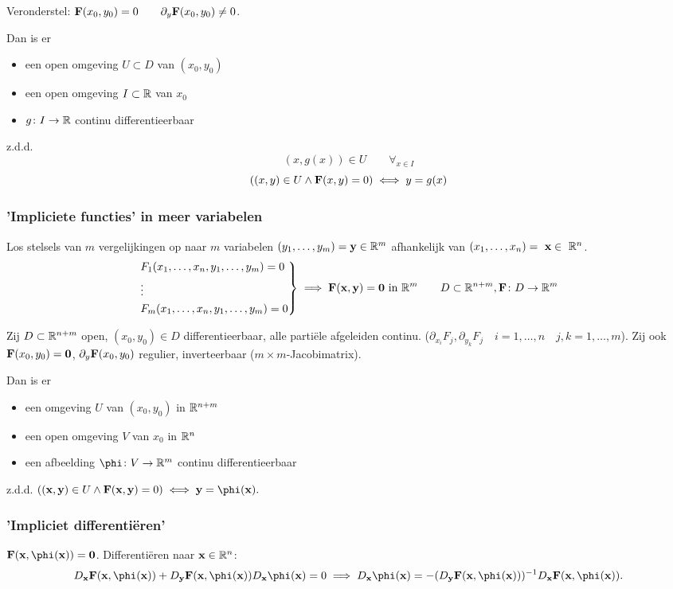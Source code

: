 \documentclass{2wa40summary}
\begin{document}
			Veronderstel: $ {\textbf{F}}(x_0, y_0) = 0 \qquad \partial_y {\textbf{F}}(x_0, y_0)\neq 0 $.
			
			Dan is er 
			\begin{itemize} 
				\item[] een open omgeving $ U \subset D $ van $ (x_0,y_0) $
				\item[] een open omgeving $ I \subset \mathbb{R} $ van $ x_0 $
				\item[] $ g\colon  I \to \mathbb{R} $ continu differentieerbaar 
			\end{itemize}
			z.d.d.
			\[ (x,g(x)) \in U \qquad \forall_{x \in I} \]
			\[ ((x,y) \in U \wedge {\textbf{F}}(x,y)=0) \iff y=g(x) \]
			
			
			\subsubsection{'Impliciete functies' in meer variabelen}
				Los stelsels van $m$ vergelijkingen op naar $m$ variabelen $(y_1, \dots ,y_m) = {\textbf{y}} \in \mathbb{R}^m$ afhankelijk van $ (x_1, \dots , x_n) =~{\textbf{x}} \in~\mathbb{R}^n $.
				\[
				\begin{rcases*}
				F_1(x_1,\dots,x_n,y_1,\dots,y_m)=0 \\
				\vdots \\
				F_m(x_1,\dots,x_n,y_1,\dots,y_m)=0
				\end{rcases*} \implies \F (\x,\y)=\zero \text{ in } \reals^m \qquad D \subset \reals^{n+m}, \F\:  D \to \reals^m
				\]
				
				 Zij $ D\subset \mathbb{R}^{n+m} $ open, $ (x_0, y_0) \in D $ differentieerbaar, alle parti\"ele afgeleiden continu. ($ \partial_{x_i}F_j , \partial_{y_k}F_j \quad i=1,\dots,n \quad j,k=1,\dots,m $). Zij ook $ {\textbf{F}}(x_0, y_0) = {\textbf{0}}$, $ \partial_y {\textbf{F}}(x_0,y_0) $ regulier, inverteerbaar ($ m\times m $-Jacobimatrix).
				
				Dan is er \begin{itemize}
					\item[] een omgeving $ U $ van $ (x_0,y_0) $ in $ \mathbb{R}^{n+m} $
					\item[] een open omgeving $V$ van $x_0$ in $\mathbb{R}^n$
					\item[] een afbeelding $ \phi \:  V\to \reals^m $ continu differentieerbaar 
				\end{itemize}
				z.d.d. $ ((\x,\y) \in U \wedge \F(\x,\y)=0) \iff \y=\phi (\x). $
				
			\subsubsection{'Impliciet differenti\"eren'}
				$ \F(\x,\phi(\x))=\zero  $. Differenti\"eren naar $ {\textbf{x}}\in \mathbb{R}^n $:
				\[ D_\x \F(\x,\phi(\x)) + D_\y \F (\x,\phi(\x))D_\x \phi(\x) = 0 \implies D_\x \phi(\x) = -(D_\y \F(\x,\phi(\x)))^{-1} D_\x \F(\x,\phi(\x)). \]
				
\end{document}
